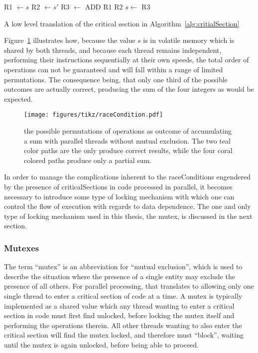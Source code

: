 \begin{algorithm}[ht]
	\DontPrintSemicolon
\nl	R1 $\leftarrow s$\;
\nl	R2 $\leftarrow s'$\;
\nl R3 $\leftarrow$ ADD R1 R2\;
\nl	$s \leftarrow$ R3\;
	\caption{A low level translation of the critical section in Algorithm~\ref{alg:critialSection} \label{alg:critialSectionLowLevel}}
\end{algorithm}%

Figure~\ref{fig:raceCondition} illustrates how, because the value $s$ is in volatile memory which is shared by both threads, and because each thread remains independent, performing their instructions sequentially at their own speeds, the total order of operations can not be guaranteed and will fall within a range of limited permutations. The consequence being, that only one third of the possible outcomes are actually correct, producing the sum of the four integers as would be expected.

\begin{figure}[ht]
\ffigbox
	{\texttt{[image: figures/tikz/raceCondition.pdf]}}
	{\caption[A Simple Race Condition]{the possible permutations of operations as outcome of accumulating a sum with parallel threads without mutual exclusion. The two teal color paths are the only produce correct results, while the four coral colored paths produce only a partial sum.}\label{fig:raceCondition}}
\end{figure}

In order to manage the complications inherent to the \glspl{raceCondition} engendered by the presence of \glspl{criticalSection} in code processed in parallel, it becomes necessary to introduce some type of locking mechanism with which one can control the flow of execution with regards to data dependence. The one and only type of locking mechanism used in this thesis, the mutex, is discussed in the next section.

%
%
\subsubsection{Mutexes}
\label{ch2sPPssPCsssM}
The term ``\gls{mutex}'' is an abbreviation for ``mutual exclusion'', which is used to describe the situation where the presence of a single entity may exclude the presence of all others. For parallel processing, that translates to allowing only one single thread to enter a critical section of code at a time. A mutex is typically implemented as a shared value which any thread wanting to enter a critical section in code must first find unlocked, before locking the mutex itself and performing the operations therein. All other threads wanting to also enter the critical section will find the mutex locked, and therefore must ``block'', waiting until the mutex is again unlocked, before being able to proceed.

